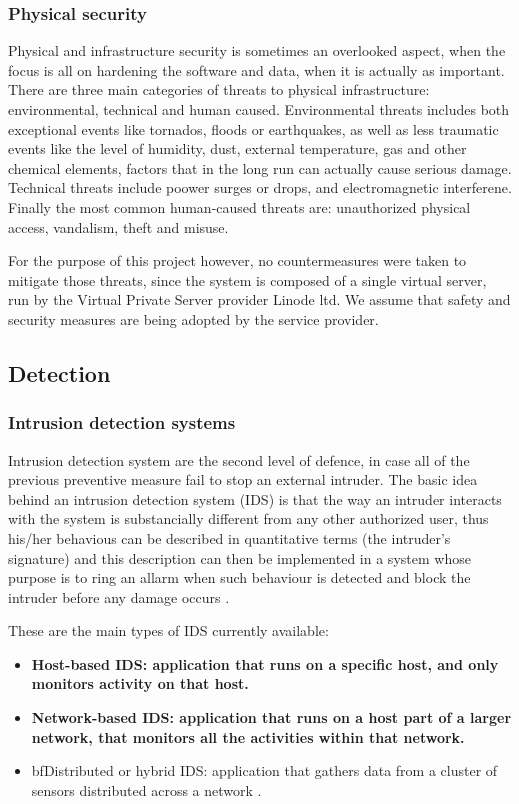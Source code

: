 \subsubsection{Physical security}
Physical and infrastructure security is sometimes an overlooked aspect, when the
focus is all on hardening the software and data, when it is actually as
important. There are three main categories of threats to physical
infrastructure: environmental, technical and human caused. Environmental threats
includes both exceptional events like tornados, floods or earthquakes, as well
as less traumatic events like the level of humidity, dust, external temperature, gas
and other chemical elements, factors that in the long run can actually cause
serious damage. Technical threats include poower surges or drops, and
electromagnetic interferene. Finally the most common human-caused threats are:
unauthorized physical access, vandalism, theft and misuse.

For the purpose of this project however, no countermeasures were taken to
mitigate those threats, since the system is composed of a single virtual server,
run by the Virtual Private Server provider Linode ltd. We assume that safety and
security measures are being adopted by the service provider.

\subsection{Detection}

\subsubsection{Intrusion detection systems}
Intrusion detection system are the second level of defence, in case all
of the previous preventive measure fail to stop an external intruder. The basic
idea behind an intrusion detection system (IDS) is that the way an intruder
interacts with the system is substancially different from any other authorized
user, thus his/her behavious can be described in quantitative terms (the
intruder's signature) and this description can then be implemented in a system
whose purpose is to ring an allarm when such behaviour is detected and block the
intruder before any damage occurs \cite{WS15}.

These are the main types of IDS currently available:
\begin{itemize}
  \item \bf{Host-based IDS}: application that runs on a specific host, and only
  monitors activity on that host.
  \item \bf{Network-based IDS}: application that runs on a host part of a larger
  network, that monitors all the activities within that network.
  \item bf{Distributed or hybrid IDS}: application that gathers data from a
  cluster of sensors distributed across a network \cite{RS00}.
\end{itemize}

